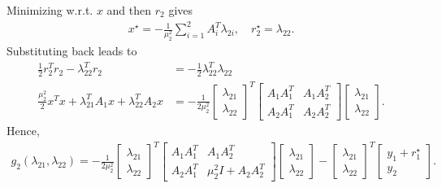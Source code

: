 \documentclass[12pt]{article}
\begin{document}
\begin{itemize}
Minimizing w.r.t. $x$ and then $r_2$ gives
%
\begin{align} \label{eq.x_r}
x^{\star} = -\frac{1}{\mu_2^2}\sum_{i=1}^{2}A_i^T\lambda_{2i}, \quad r_2^{\star} = \lambda_{22}.
\end{align}
%
Substituting back leads to
%
\begin{align*}
\frac{1}{2}r_2^Tr_2 - \lambda_{22}^Tr_2 &= -\frac{1}{2}\lambda_{22}^T\lambda_{22} \\
\frac{\mu_2^2}{2} x^Tx + \lambda_{21}^TA_1x + \lambda_{22}^TA_2x
&= -\frac{1}{2\mu_2^2} \begin{bmatrix} \lambda_{21} \\ \lambda_{22} \end{bmatrix}^T
\begin{bmatrix} A_1A_1^T & A_1A_2^T \\ A_2A_1^T & A_2A_2^T \end{bmatrix}
\begin{bmatrix} \lambda_{21} \\ \lambda_{22} \end{bmatrix}.
\end{align*}
%
Hence,
%
\begin{align*}
g_2(\lambda_{21},\lambda_{22}) =
-\frac{1}{2\mu_2^2} \begin{bmatrix} \lambda_{21} \\ \lambda_{22} \end{bmatrix}^T
\begin{bmatrix} A_1A_1^T & A_1A_2^T \\ A_2A_1^T & \mu_2^2 I+A_2A_2^T \end{bmatrix}
\begin{bmatrix} \lambda_{21} \\ \lambda_{22} \end{bmatrix} -
\begin{bmatrix} \lambda_{21} \\ \lambda_{22} \end{bmatrix}^T \begin{bmatrix} y_1+r_1^{\star} \\ y_2 \end{bmatrix}.
\end{align*}


\end{itemize}
\end{document}
